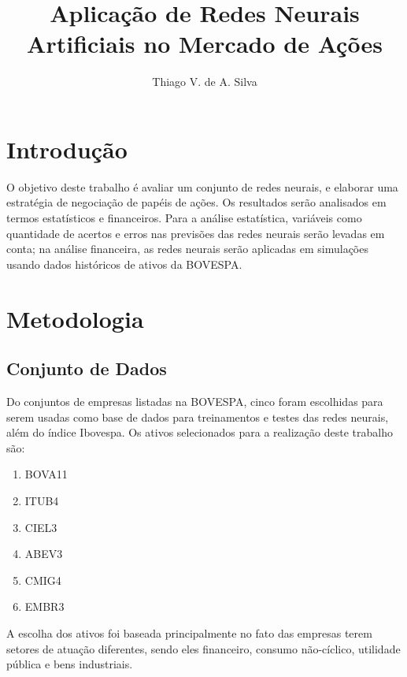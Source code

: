 \documentclass[12pt]{article}
\title{Aplicação de Redes Neurais Artificiais no Mercado de Ações}
\author{Thiago V. de A. Silva\inst{1} }
\begin{document}
 

\maketitle

\section{Introdução}

O objetivo deste trabalho é avaliar um conjunto de redes neurais, e elaborar uma estratégia de negociação de papéis de ações. Os resultados serão analisados em termos estatísticos e financeiros. Para a análise estatística, variáveis como quantidade de acertos e erros nas previsões das redes neurais serão levadas em conta; na análise financeira, as redes neurais serão aplicadas em simulações usando dados históricos de ativos da BOVESPA.

\section{Metodologia} \label{sec:firstpage}

\subsection{Conjunto de Dados}
Do conjuntos de empresas listadas na BOVESPA, cinco foram escolhidas para serem usadas como base de dados para treinamentos e testes das redes neurais, além do índice Ibovespa. %
Os ativos selecionados para a realização deste trabalho são:
\begin{enumerate}
\item BOVA11
\item ITUB4
\item CIEL3
\item ABEV3
\item CMIG4
\item EMBR3
\end{enumerate}

A escolha dos ativos foi baseada principalmente no fato das empresas terem setores de atuação diferentes, sendo eles financeiro, consumo não-cíclico, utilidade pública e bens industriais.
\end{document}
